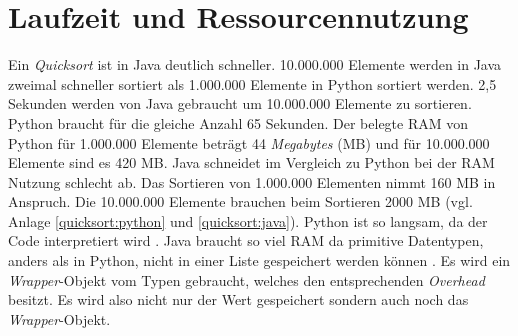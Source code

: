\section{Laufzeit und Ressourcennutzung}
Ein \textit{Quicksort} ist in Java deutlich schneller. 10.000.000  Elemente werden in Java zweimal schneller sortiert als 1.000.000 Elemente in Python sortiert werden. 2,5 Sekunden werden von Java gebraucht um 10.000.000 Elemente zu sortieren. Python braucht für die gleiche Anzahl 65 Sekunden. Der belegte RAM von Python für 1.000.000 Elemente beträgt 44 \textit{Megabytes} (MB) und für 10.000.000 Elemente sind es 420 MB. Java schneidet im Vergleich zu Python bei der RAM Nutzung schlecht ab. Das Sortieren von 1.000.000 Elementen nimmt 160 MB in Anspruch. Die 10.000.000 Elemente brauchen beim Sortieren 2000 MB (vgl. Anlage \ref{quicksort:python} und \ref{quicksort:java}). Python ist so langsam, da der Code interpretiert wird \cite{Python3:Buch}. Java braucht so viel RAM da primitive Datentypen, anders als in Python, nicht in einer Liste gespeichert werden können \cite{Louis:2010}. Es wird ein \textit{Wrapper}-Objekt vom Typen  gebraucht, welches den entsprechenden \textit{Overhead} besitzt. Es wird also nicht nur der Wert gespeichert sondern auch noch das \textit{Wrapper}-Objekt.
